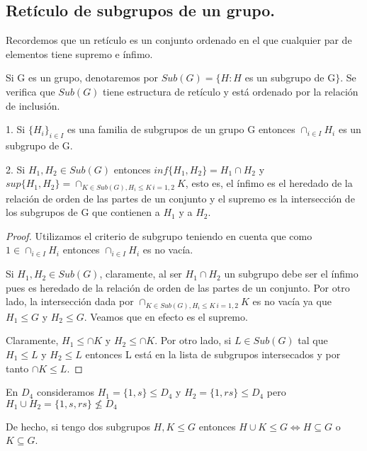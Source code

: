 \subsection{Retículo de subgrupos de un grupo.}

\begin{definition}
Recordemos que un retículo es un conjunto ordenado en el que cualquier par de elementos tiene supremo e ínfimo.

Si G es un grupo, denotaremos por $Sub(G) = \{H : H$ es un subgrupo de G$\}$. Se verifica que $Sub(G)$ tiene estructura de retículo y está ordenado por la relación de inclusión.
\end{definition}

\begin{proposition}
1. Si $\{H_i\}_{i \in I}$ es una familia de subgrupos de un grupo G entonces $\cap_{i \in I} H_i$ es un subgrupo de G.

2. Si $H_1,H_2 \in Sub(G)$ entonces $inf\{H_1,H_2\} = H_1 \cap H_2$ y $sup\{H_1,H_2\} = \cap_{K \in Sub(G), H_i \le K \, i = 1,2} K$, esto es, el ínfimo es el heredado de la relación de orden de las partes de un conjunto y el supremo es la intersección de los subgrupos de G que contienen a $H_1$ y a $H_2$.
\end{proposition}

\begin{proof}
Utilizamos el criterio de subgrupo teniendo en cuenta que como $ 1 \in \cap_{i \in I} H_i$ entonces $\cap_{i \in I} H_i$ es no vacía.

Si $H_1,H_2 \in Sub(G)$, claramente, al ser $H_1 \cap H_2$ un subgrupo debe ser el ínfimo pues es heredado de la relación de orden de las partes de un conjunto. Por otro lado, la intersección dada por $\cap_{K \in Sub(G), H_i \le K \, i = 1,2} K$ es no vacía ya que $H_1 \le G$ y $H_2 \le G$. Veamos que en efecto es el supremo.

Claramente, $H_1 \le \cap K$ y $H_2 \le \cap K$. Por otro lado, si $L \in Sub(G)$ tal que $H_1 \le L$ y $H_2 \le L$ entonces L está en la lista de subgrupos intersecados y por tanto $\cap K \le L$.
\end{proof}

\begin{example}
En $D_4$ consideramos $H_1 = \{1,s\} \le D_4$ y $H_2 = \{1,rs\} \le D_4$ pero 
$H_1 \cup H_2 = \{1,s,rs\} \nleq D_4$

De hecho, si tengo dos subgrupos $H,K \le G$ entonces $H \cup K \le G \iff H \subseteq G$ o $K \subseteq G$.
\end{example}

